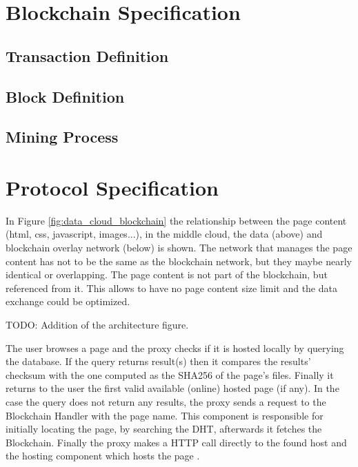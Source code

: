 \documentclass[12pt,fleqn]{book} %
\begin{document}

\chapter{Blockchain Specification}

\section{Transaction Definition}


\section{Block Definition}


\section{Mining Process}


\chapter{Protocol Specification}

In Figure \ref{fig:data_cloud_blockchain} the relationship between the page
content (html, css, javascript, images...), in the middle cloud, the data
(above) and blockchain overlay network (below) is shown. The network that
manages the page content has not to be the same as the blockchain network, but
they maybe nearly identical or overlapping. The page content is not part of
the blockchain, but referenced from it. This allows to have no page content
size limit and the data exchange could be optimized.

TODO: Addition of the architecture figure.

The user browses a page and the proxy checks if it is hosted locally by querying
the database. If the query returns result(s) then it compares the results’
checksum  with the one  computed as the SHA256 of the page’s files. Finally it
returns to the user the first valid available (online) hosted page (if any). In
the case the query does not return any results, the proxy sends a request to the
  Blockchain Handler with the page name. This component is responsible for
  initially locating the page, by searching the DHT, afterwards it fetches the
  Blockchain. Finally the proxy makes a HTTP call directly to the found host
  and the hosting component which hosts the page .
\end{document}
